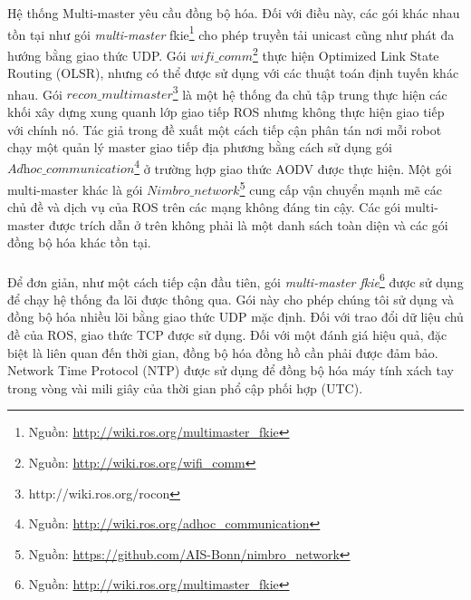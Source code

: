 \documentclass[11pt,openany]{book}
\begin{document}
Hệ thống Multi-master yêu cầu đồng bộ hóa. Đối với điều này, các gói khác nhau tồn tại như gói \textit{multi-master} fkie\footnote{Nguồn: \url{http://wiki.ros.org/multimaster_fkie}} cho phép truyền tải unicast cũng như phát đa hướng bằng giao thức UDP. Gói $\textit{wifi\_comm}$\footnote{Nguồn: \url{http://wiki.ros.org/wifi_comm}} thực hiện Optimized Link State Routing (OLSR), nhưng có thể được sử dụng với các thuật toán định tuyến khác nhau. Gói $\textit{recon\_multimaster}$\footnote{http://wiki.ros.org/rocon} là một hệ thống đa chủ tập trung thực hiện các khối xây dựng xung quanh lớp giao tiếp ROS nhưng không thực hiện giao tiếp với chính nó. Tác giả trong \cite{andre2014coordinated} đề xuất một cách tiếp cận phân tán nơi mỗi robot chạy một quản lý master giao tiếp địa phương bằng cách sử dụng gói $\textit{Adhoc\_communication}$\footnote{Nguồn: \url{http://wiki.ros.org/adhoc_communication}} ở trường hợp giao thức AODV được thực hiện. Một gói multi-master khác là gói $\textit{Nimbro\_network}$\footnote{Nguồn: \url{https://github.com/AIS-Bonn/nimbro_network}} cung cấp vận chuyển mạnh mẽ các chủ đề và dịch vụ của ROS trên các mạng không đáng tin cậy. Các gói multi-master được trích dẫn ở trên không phải là một danh sách toàn diện và các gói đồng bộ hóa khác tồn tại.\\\\
Để đơn giản, như một cách tiếp cận đầu tiên, gói \textit{multi-master fkie}\footnote{Nguồn: \url{http://wiki.ros.org/multimaster_fkie}} được sử dụng để chạy hệ thống đa lõi được thông qua. Gói này cho phép chúng tôi sử dụng và đồng bộ hóa nhiều lõi bằng giao thức UDP mặc định. Đối với trao đổi dữ liệu chủ đề của ROS, giao thức TCP được sử dụng. Đối với một đánh giá hiệu quả, đặc biệt là liên quan đến thời gian, đồng bộ hóa đồng hồ cần phải được đảm bảo. Network Time Protocol (NTP) được sử dụng để đồng bộ hóa máy tính xách tay trong vòng vài mili giây của thời gian phổ cập phối hợp (UTC).
\end{document}
